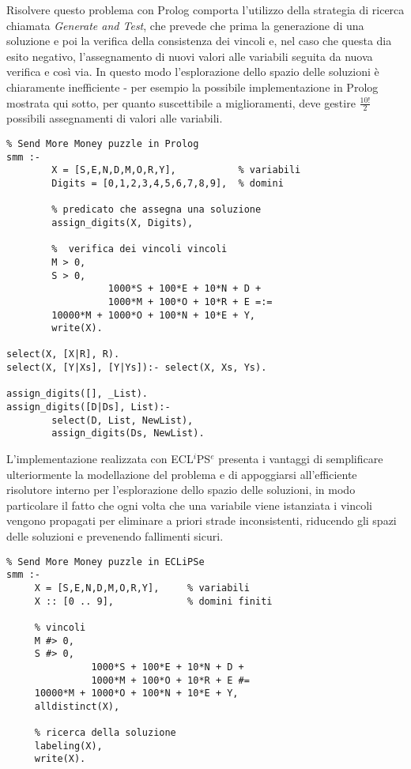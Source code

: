 Risolvere questo problema con Prolog comporta l'utilizzo della strategia di ricerca chiamata \emph{Generate and Test}, che prevede che prima la generazione di una soluzione e poi la verifica della consistenza dei vincoli e, nel caso che questa dia esito negativo, l'assegnamento di nuovi valori alle variabili seguita da nuova verifica e così via. In questo modo l'esplorazione dello spazio delle soluzioni è chiaramente inefficiente - per esempio la possibile implementazione in Prolog mostrata qui sotto, per quanto suscettibile a miglioramenti, deve gestire $\frac{10!}{2}$ possibili assegnamenti di valori alle variabili. 

\lstset{language=Prolog}
\begin{lstlisting}
% Send More Money puzzle in Prolog
smm :-
        X = [S,E,N,D,M,O,R,Y],           % variabili
        Digits = [0,1,2,3,4,5,6,7,8,9],	 % domini
        
        % predicato che assegna una soluzione
        assign_digits(X, Digits),
       	
       	%  verifica dei vincoli vincoli
        M > 0, 
        S > 0,
                  1000*S + 100*E + 10*N + D +
                  1000*M + 100*O + 10*R + E =:=
        10000*M + 1000*O + 100*N + 10*E + Y,
        write(X).

select(X, [X|R], R).
select(X, [Y|Xs], [Y|Ys]):- select(X, Xs, Ys).

assign_digits([], _List).
assign_digits([D|Ds], List):-
        select(D, List, NewList),
        assign_digits(Ds, NewList).
\end{lstlisting}

L'implementazione realizzata con ECL$^i$PS$^e$ presenta i vantaggi di semplificare ulteriormente la modellazione del problema e di appoggiarsi all'efficiente risolutore interno per l'esplorazione dello spazio delle soluzioni, in modo particolare il fatto che ogni volta che una variabile viene istanziata i vincoli vengono propagati per eliminare a priori strade inconsistenti, riducendo gli spazi delle soluzioni e prevenendo fallimenti sicuri. 

\begin{lstlisting}
% Send More Money puzzle in ECLiPSe
smm :-
     X = [S,E,N,D,M,O,R,Y],		% variabili
     X :: [0 .. 9],				% domini finiti
     
     % vincoli
     M #> 0,
     S #> 0,
               1000*S + 100*E + 10*N + D +
               1000*M + 100*O + 10*R + E #=
     10000*M + 1000*O + 100*N + 10*E + Y,
     alldistinct(X),
     
     % ricerca della soluzione
     labeling(X),
     write(X).

\end{lstlisting}

